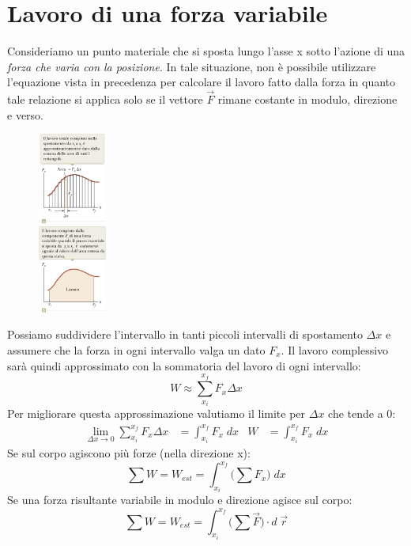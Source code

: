 \documentclass[a4paper,11pt,oneside]{book}
\begin{document}
\section{Lavoro di una forza variabile}
Consideriamo un punto materiale che si sposta lungo l’asse x sotto l’azione di una \emph{forza che varia con la posizione}. In tale situazione, non è possibile utilizzare l'equazione vista in
precedenza per calcolare il lavoro fatto dalla forza in quanto tale relazione si applica solo se il vettore $\vec{F}$ rimane costante in modulo, direzione e verso.

\begin{figure}
    \centering
    \includegraphics[width=0.20\textwidth]{lavoro_forza_variabile.png}
\end{figure}
Possiamo suddividere l'intervallo in tanti piccoli intervalli di spostamento $\Delta x$ e assumere che la forza in ogni intervallo valga un dato $F_x$. 
Il lavoro complessivo sarà quindi approssimato con la sommatoria
del lavoro di ogni intervallo:
\begin{equation*}
    W \approx \sum_{x_i}^{x_f} F_x \Delta x
\end{equation*}
Per migliorare questa approssimazione valutiamo il limite per $\Delta x$ che tende a 0:
\begin{align*}
    \lim_{\Delta x \to 0} \sum_{x_i}^{x_f} F_x \Delta x &= \int_{x_i}^{x_f} F_x \; dx & W&= \int_{x_i}^{x_f} F_x \; dx
\end{align*}
Se sul corpo agiscono più forze (nella direzione x):
\begin{equation*}
    \sum W = W_{est} = \int_{x_i}^{x_f} \big(\sum F_x \big) \; dx
\end{equation*}
Se una forza risultante variabile in modulo e direzione agisce sul corpo:
\begin{equation*}
    \sum W = W_{est} = \int_{x_i}^{x_f} \big(\sum \vec{F} \big) \cdot d \; \vec{r}
\end{equation*}
\end{document}
